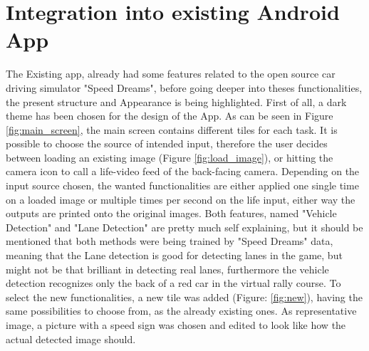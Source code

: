 
\chapter{Integration into existing Android App}\label{chapter:Integration into existing App}

The Existing app, already had some features related to the open source car driving simulator "Speed Dreams", before going deeper into theses functionalities, the present structure and Appearance is being highlighted.
First of all, a dark theme has been chosen for the design of the App. As can be seen in Figure \ref{fig:main_screen}, the main screen contains different tiles for each task. It is possible to choose the source of intended input, therefore the user decides between loading an existing image (Figure \ref{fig:load_image}), or hitting the camera icon to call a life-video feed of the back-facing camera. Depending on the input source chosen, the wanted functionalities are either applied one single time on a loaded image or multiple times per second on the life input, either way the outputs are printed onto the original images. Both features, named "Vehicle Detection" and "Lane Detection" are pretty much self explaining, but it should be mentioned that both methods were being trained by "Speed Dreams" data, meaning that the Lane detection is good for detecting lanes in the game, but might not be that brilliant in detecting real lanes, furthermore the vehicle detection recognizes only the back of a red car in the virtual rally course.\newline
To select the new functionalities, a new tile was added (Figure: \ref{fig:new}), having the same possibilities to choose from, as the already existing ones. As representative image, a picture with a speed sign was chosen and edited to look like how the actual detected image should. 
